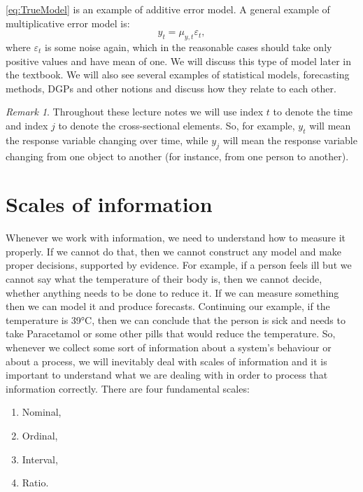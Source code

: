 \documentclass[
]{book}
\providecommand{\tightlist}{%
  \setlength{\itemsep}{0pt}\setlength{\parskip}{0pt}}
\theoremstyle{definition}
\theoremstyle{definition}
\theoremstyle{definition}
\theoremstyle{definition}
\theoremstyle{remark}
\newtheorem*{remark}{Remark}
\begin{document}
\eqref{eq:TrueModel} is an example of additive error model. A general example of multiplicative error model is:
\begin{equation}
    y_t = \mu_{y,t} \varepsilon_t,
    \label{eq:TrueModelMultiplicative}
\end{equation}
where \(\varepsilon_t\) is some noise again, which in the reasonable cases should take only positive values and have mean of one. We will discuss this type of model later in the textbook. We will also see several examples of statistical models, forecasting methods, DGPs and other notions and discuss how they relate to each other.

\begin{remark}
Throughout these lecture notes we will use index \(t\) to denote the time and index \(j\) to denote the cross-sectional elements. So, for example, \(y_t\) will mean the response variable changing over time, while \(y_j\) will mean the response variable changing from one object to another (for instance, from one person to another).
\end{remark}

\section{Scales of information}\label{scales}

Whenever we work with information, we need to understand how to measure it properly. If we cannot do that, then we cannot construct any model and make proper decisions, supported by evidence. For example, if a person feels ill but we cannot say what the temperature of their body is, then we cannot decide, whether anything needs to be done to reduce it. If we can measure something then we can model it and produce forecasts. Continuing our example, if the temperature is 39°C, then we can conclude that the person is sick and needs to take Paracetamol or some other pills that would reduce the temperature. So, whenever we collect some sort of information about a system's behaviour or about a process, we will inevitably deal with scales of information and it is important to understand what we are dealing with in order to process that information correctly. There are four fundamental scales:

\begin{enumerate}
\def\labelenumi{\arabic{enumi}.}
\tightlist
\item
  Nominal,
\item
  Ordinal,
\item
  Interval,
\item
  Ratio.
\end{enumerate}
\end{document}
